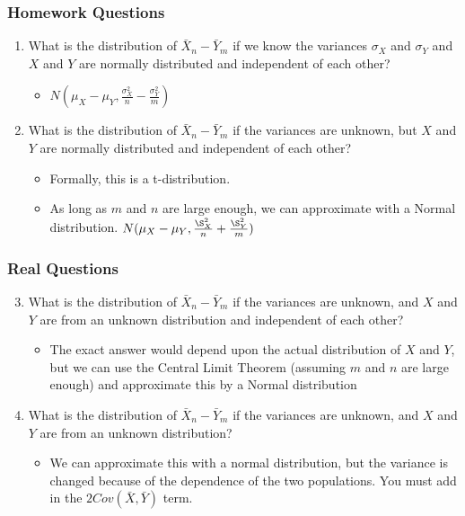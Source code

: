 \documentclass{beamer}
\begin{document}
\begin{frame}
\frametitle{Homework Questions}
    \begin{enumerate}[<+- | alert@+>]
		\item What is the distribution of $\bar{X}_n - \bar{Y}_m$ if we know the variances $\sigma_X$ and $\sigma_Y$ and $X$ and $Y$ are normally distributed and independent of each other?
			\begin{itemize}
				\item $N \left( \mu_X - \mu_Y, \frac{\sigma_X^2}{n} - \frac{\sigma_Y^2}{m} \right)$
			\end{itemize}			        
		\item What is the distribution of $\bar{X}_n - \bar{Y}_m$ if the variances are unknown, but $X$ and $Y$ are normally distributed and independent of each other?
			\begin{itemize}
				\item Formally, this is a t-distribution. 
				\item As long as $m$ and $n$ are large enough, we can approximate with a Normal distribution. $N(\mu_X - \mu_Y, \frac{\S_X^2}{n} + \frac{\S_Y^2}{m})$
			\end{itemize}		            
    \end{enumerate}
\end{frame} 

\begin{frame}
\frametitle{Real Questions}
    \begin{enumerate}[<+- | alert@+>]
    \setcounter{enumi}{2}
	    \item What is the distribution of $\bar{X}_n - \bar{Y}_m$ if the variances are unknown, and $X$ and $Y$ are from an unknown distribution and independent of each other?
        	\begin{itemize}
        		\item The exact answer would depend upon the actual distribution of $X$ and $Y$, but we can use the Central Limit Theorem (assuming $m$ and $n$ are large enough) and approximate this by a Normal distribution
        	\end{itemize}
        	\item What is the distribution of $\bar{X}_n - \bar{Y}_m$ if the variances are unknown, and $X$ and $Y$ are from an unknown distribution?
        	\begin{itemize}
        		\item We can approximate this with a normal distribution, but the variance is changed because of the dependence of the two populations. You must add in the $2Cov(\bar{X}, \bar{Y})$ term. 
        	\end{itemize}
    \end{enumerate}
\end{frame} 
\end{document}
